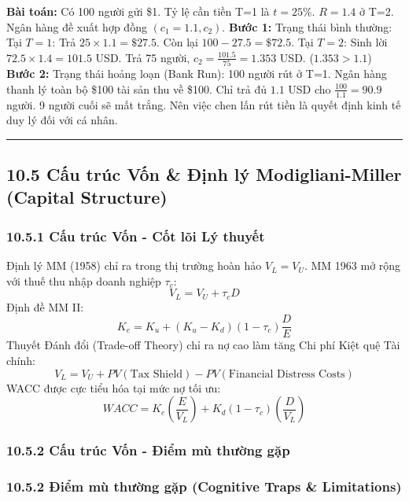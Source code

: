 \documentclass[
]{article}
\begin{document}
\textbf{Bài toán:} Có 100 người gửi \$1. Tỷ lệ cần tiền T=1 là
\(t = 25\%\). \(R = 1.4\) ở T=2. Ngân hàng đề xuất hợp đồng
\((c_1 = 1.1, c_2)\). \textbf{Bước 1:} Trạng thái bình thường: Tại
\(T=1\): Trả \(25 \times 1.1 = \$27.5\). Còn lại
\(100 - 27.5 = \$72.5\). Tại \(T=2\): Sinh lời
\(72.5 \times 1.4 = 101.5\) USD. Trả 75 người,
\(c_2 = \frac{101.5}{75} = 1.353\) USD. (\(1.353 > 1.1\)) \textbf{Bước
2:} Trạng thái hoảng loạn (Bank Run): 100 người rút ở T=1. Ngân hàng
thanh lý toàn bộ \$100 tài sản thu về \$100. Chỉ trả đủ \(1.1\) USD cho
\(\frac{100}{1.1} = 90.9\) người. 9 người cuối sẽ mất trắng. Nên việc
chen lấn rút tiền là quyết định kinh tế duy lý đối với cá nhân.

\begin{center}\rule{0.5\linewidth}{0.5pt}\end{center}

\subsection{10.5 Cấu trúc Vốn \& Định lý Modigliani-Miller (Capital
Structure)}\label{cux1ea5u-truxfac-vux1ed1n-ux111ux1ecbnh-luxfd-modigliani-miller-capital-structure}

\subsubsection{10.5.1 Cấu trúc Vốn - Cốt lõi Lý
thuyết}\label{cux1ea5u-truxfac-vux1ed1n---cux1ed1t-luxf5i-luxfd-thuyux1ebft}

Định lý MM (1958) chỉ ra trong thị trường hoàn hảo \(V_L = V_U\). MM
1963 mở rộng với thuế thu nhập doanh nghiệp \(\tau_c\):
\[ V_L = V_U + \tau_c D \] Định đề MM II:
\[ K_e = K_u + (K_u - K_d)(1 - \tau_c)\frac{D}{E} \] Thuyết Đánh đổi
(Trade-off Theory) chỉ ra nợ cao làm tăng Chi phí Kiệt quệ Tài chính:
\[ V_L = V_U + PV(\text{Tax Shield}) - PV(\text{Financial Distress Costs}) \]
WACC được cực tiểu hóa tại mức nợ tối ưu:
\[ WACC = K_e \left(\frac{E}{V_L}\right) + K_d (1 - \tau_c) \left(\frac{D}{V_L}\right) \]

\subsubsection{10.5.2 Cấu trúc Vốn - Điểm mù thường
gặp}\label{cux1ea5u-truxfac-vux1ed1n---ux111iux1ec3m-muxf9-thux1b0ux1eddng-gux1eb7p}

\subsubsection{10.5.2 Điểm mù thường gặp (Cognitive Traps \&
Limitations)}\label{ux111iux1ec3m-muxf9-thux1b0ux1eddng-gux1eb7p-cognitive-traps-limitations-84}
\end{document}
